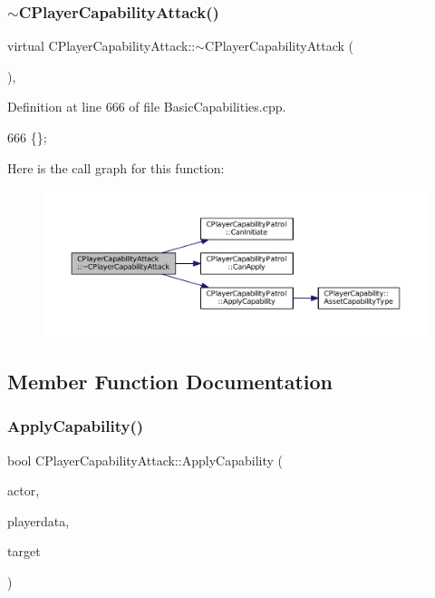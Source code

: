 \subsubsection{\texorpdfstring{$\sim$\+C\+Player\+Capability\+Attack()}{~CPlayerCapabilityAttack()}}
{\footnotesize\ttfamily virtual C\+Player\+Capability\+Attack\+::$\sim$\+C\+Player\+Capability\+Attack (\begin{DoxyParamCaption}{ }\end{DoxyParamCaption})\hspace{0.3cm}{\ttfamily [inline]}, {\ttfamily [virtual]}}



Definition at line 666 of file Basic\+Capabilities.\+cpp.


\begin{DoxyCode}
666 \{\};
\end{DoxyCode}
Here is the call graph for this function\+:\nopagebreak
\begin{figure}[H]
\begin{center}
\leavevmode
\includegraphics[width=350pt]{classCPlayerCapabilityAttack_ac18875f6e891a2e8b805ed42bb001bb3_cgraph}
\end{center}
\end{figure}


\subsection{Member Function Documentation}
\hypertarget{classCPlayerCapabilityAttack_a536095f572f9f6af786eaec0376f3771}{}\label{classCPlayerCapabilityAttack_a536095f572f9f6af786eaec0376f3771} 
\subsubsection{\texorpdfstring{Apply\+Capability()}{ApplyCapability()}}
{\footnotesize\ttfamily bool C\+Player\+Capability\+Attack\+::\+Apply\+Capability (\begin{DoxyParamCaption}\item[{std\+::shared\+\_\+ptr$<$ \hyperlink{classCPlayerAsset}{C\+Player\+Asset} $>$}]{actor,  }\item[{std\+::shared\+\_\+ptr$<$ \hyperlink{classCPlayerData}{C\+Player\+Data} $>$}]{playerdata,  }\item[{std\+::shared\+\_\+ptr$<$ \hyperlink{classCPlayerAsset}{C\+Player\+Asset} $>$}]{target }\end{DoxyParamCaption})\hspace{0.3cm}{\ttfamily [virtual]}}



